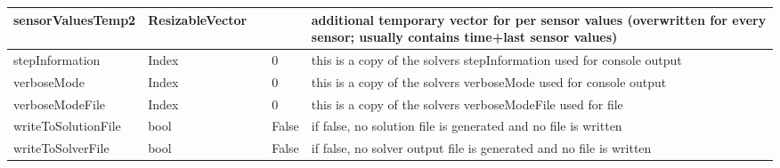 \begin{center}
\begin{longtable}{| p{4.2cm} | p{2.5cm} | p{0.3cm} | p{3.0cm} | p{6cm} |}
    sensorValuesTemp2 &     ResizableVector &      &      &     additional temporary vector for per sensor values (overwritten for every sensor; usually contains time+last sensor values)\\ \hline
    stepInformation &     Index &      &     0 &     this is a copy of the solvers stepInformation used for console output\\ \hline
    verboseMode &     Index &      &     0 &     this is a copy of the solvers verboseMode used for console output\\ \hline
    verboseModeFile &     Index &      &     0 &     this is a copy of the solvers verboseModeFile used for file\\ \hline
    writeToSolutionFile &     bool &      &     False &     if false, no solution file is generated and no file is written\\ \hline
    writeToSolverFile &     bool &      &     False &     if false, no solver output file is generated and no file is written\\ \hline
	  \end{longtable}
	\end{center}

